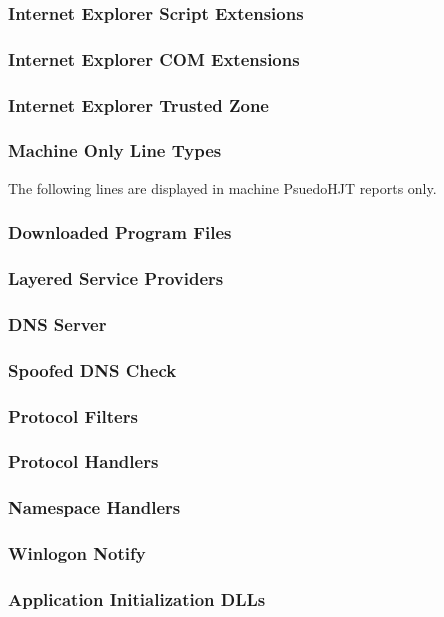 \subsubsection{Internet Explorer Script Extensions}
\subsubsection{Internet Explorer COM Extensions}
\subsubsection{Internet Explorer Trusted Zone}

\subsubsection{Machine Only Line Types}
The following lines are displayed in machine PsuedoHJT reports only.

\subsubsection{Downloaded Program Files}
\subsubsection{Layered Service Providers}
\subsubsection{DNS Server}
\subsubsection{Spoofed DNS Check}
\subsubsection{Protocol Filters}
\subsubsection{Protocol Handlers}
\subsubsection{Namespace Handlers}
\subsubsection{Winlogon Notify}
\subsubsection{Application Initialization DLLs}
